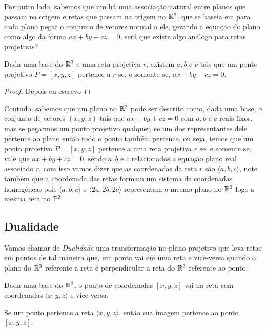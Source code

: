 
Por outro lado, sabemos que um há uma associação natural entre planos que passam na origem e retas que passam na origem no $\mathbb{R}^3$, que se baseia em para cada plano pegar o conjunto de vetores normal a ele, gerando a equação do plano como algo da forma $ax+by+cz = 0$, será que existe algo análogo para retas projetivas?

\begin{thm}
Dada uma base do $\mathbb{R}^3$ e uma reta projetiva $r$, existem $a,b$ e $c$ tais que um ponto projetivo $P = [x,y,z]$ pertence a $r$ se, e somente se, $ax+by+cz=0$.
\end{thm}
\begin{proof}
Depois eu escrevo
\end{proof}

Contudo, sabemos que um plano no $\mathbb{R}^3$ pode ser descrito como, dada uma base, o conjunto de vetores $(x,y,z)$ tais que $ax+by+cz = 0$ com $a,b$ e $c$ reais fixos, mas se pegarmos um ponto projetivo qualquer, se um dos representantes dele pertence ao plano então todo o ponto também pertence, ou seja, temos que um ponto projetivo $P = [x,y,z]$ pertence a uma reta projetiva $r$ se, e somente se, vale que $ax+by+cz = 0$, sendo $a,b$ e $c$ relacionados a equação plano real associado $r$, com isso vamos dizer que as coordenadas da reta $r$ são $\langle a,b,c\rangle$, note também que a coordenada das retas formam um sistema de coordenadas homogêneas pois $\langle a,b,c\rangle$ e $\langle 2a,2b,2c\rangle$ representam o mesmo plano no $\mathbb{R}^3$ logo a mesma reta no $\mathbb{P}^2$

\subsection{Dualidade}

\begin{defn}[Dualidade]
Vamos chamar de \emph{Dualidade} uma transformação no plano projetivo que leva retas em pontos de tal maneira que, um ponto vai em uma reta e vice-versa quando o plano do $\mathbb{R}^3$ referente a reta é perpendicular a reta do $\mathbb{R}^3$ referente ao ponto.
\end{defn}

\begin{prop}
Dada uma base do $\mathbb{R}^3$, o ponto de coordenadas $[x,y,z]$ vai na reta com coordenadas $\langle x,y,z \rangle$ e vice-versa.
\end{prop}
\begin{prop}
Se um ponto pertence a reta $\langle x,y,z \rangle$, então sua imagem pertence ao ponto $[x,y,z]$.
\end{prop}

